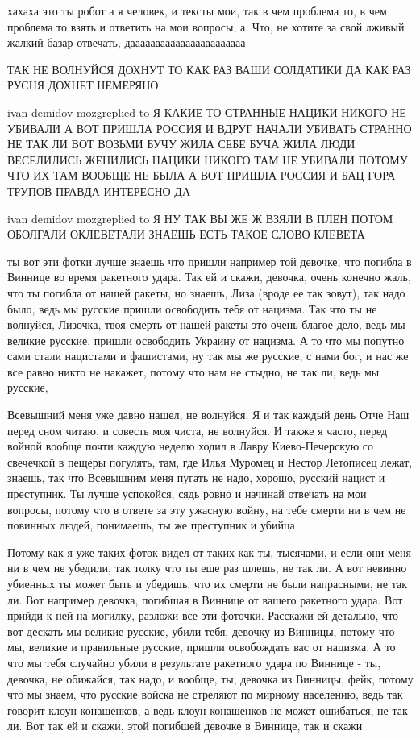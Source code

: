 хахаха это ты робот а я человек, и тексты мои, так в чем проблема то, в чем
проблема то взять и ответить на мои вопросы, а. Что, не хотите за свой лживый
жалкий базар отвечать, дааааааааааааааааааааааа

ТАК НЕ ВОЛНУЙСЯ ДОХНУТ ТО КАК РАЗ ВАШИ СОЛДАТИКИ ДА КАК РАЗ РУСНЯ ДОХНЕТ
НЕМЕРЯНО

ivan demidov mozgreplied to Я КАКИЕ ТО СТРАННЫЕ НАЦИКИ НИКОГО НЕ УБИВАЛИ А ВОТ
ПРИШЛА РОССИЯ И ВДРУГ НАЧАЛИ УБИВАТЬ СТРАННО НЕ ТАК ЛИ ВОТ ВОЗЬМИ БУЧУ ЖИЛА
СЕБЕ БУЧА ЖИЛА ЛЮДИ ВЕСЕЛИЛИСЬ ЖЕНИЛИСЬ НАЦИКИ НИКОГО ТАМ НЕ УБИВАЛИ ПОТОМУ ЧТО
ИХ ТАМ ВООБЩЕ НЕ БЫЛА А ВОТ ПРИШЛА РОССИЯ И БАЦ ГОРА ТРУПОВ ПРАВДА ИНТЕРЕСНО ДА

ivan demidov mozgreplied to Я НУ ТАК ВЫ ЖЕ Ж ВЗЯЛИ В ПЛЕН ПОТОМ ОБОЛГАЛИ
ОКЛЕВЕТАЛИ ЗНАЕШЬ ЕСТЬ ТАКОЕ СЛОВО КЛЕВЕТА

ты вот эти фотки лучше знаешь что пришли например той девочке, что погибла в
Виннице во время ракетного удара. Так ей и скажи, девочка, очень конечно жаль,
что ты погибла от нашей ракеты, но знаешь, Лиза (вроде ее так зовут), так надо
было, ведь мы русские пришли освободить тебя от нацизма. Так что ты не
волнуйся, Лизочка, твоя смерть от нашей ракеты это очень благое дело, ведь мы
великие русские, пришли освободить Украину от нацизма. А то что мы попутно сами
стали нацистами и фашистами, ну так мы же русские, с нами бог, и нас же все
равно никто не накажет, потому что нам не стыдно, не так ли, ведь мы русские, 

Всевышний меня уже давно нашел, не волнуйся. Я и так каждый день Отче Наш перед
сном читаю, и совесть моя чиста, не волнуйся. И также я часто, перед войной
вообще почти каждую неделю ходил в Лавру Киево-Печерскую со свечечкой в пещеры
погулять, там, где Илья Муромец и Нестор Летописец лежат, знаешь, так что
Всевышним меня пугать не надо, хорошо, русский нацист и преступник. Ты лучше
успокойся, сядь ровно и начинай отвечать на мои вопросы, потому что в ответе за
эту ужасную войну, на тебе смерти ни в чем не повинных людей, понимаешь, ты же
преступник и убийца

Потому как я уже таких фоток видел от таких как ты, тысячами, и если они меня ни
в чем не убедили, так толку что ты еще раз шлешь, не так ли. А вот невинно
убиенных ты может быть и убедишь, что их смерти не были напрасными, не так ли.
Вот например девочка, погибшая в Виннице от вашего ракетного удара. Вот прийди
к ней на могилку, разложи все эти фоточки. Расскажи ей детально, что вот
дескать мы великие русские, убили тебя, девочку из Винницы, потому что мы,
великие и правильные русские, пришли освобождать вас от нацизма. А то что мы
тебя случайно убили в результате ракетного удара по Виннице - ты, девочка, не
обижайся, так надо, и вообще, ты, девочка из Винницы, фейк, потому что мы
знаем, что русские войска не стреляют по мирному населению, ведь так говорит
клоун конашенков, а ведь клоун конашенков не может ошибаться, не так ли. Вот
так ей и скажи, этой погибшей девочке в Виннице, так и скажи

